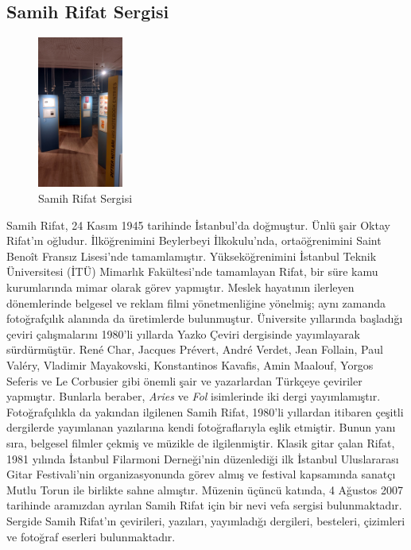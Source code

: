 \subsection{Samih Rifat Sergisi}
\begin{figure}
    \centering
    \includegraphics[width=0.25\textwidth]{assets/samih_rifat.jpg}
    \caption{Samih Rifat Sergisi}
\end{figure}
\indent\indent Samih Rifat, 24 Kasım 1945 tarihinde İstanbul'da doğmuştur. Ünlü şair Oktay Rifat'ın oğludur. İlköğrenimini Beylerbeyi İlkokulu’nda, ortaöğrenimini Saint Benoît Fransız Lisesi’nde tamamlamıştır. Yükseköğrenimini İstanbul Teknik Üniversitesi (İTÜ) Mimarlık Fakültesi’nde tamamlayan Rifat, bir süre kamu kurumlarında mimar olarak görev yapmıştır.\newline
\indent Meslek hayatının ilerleyen dönemlerinde belgesel ve reklam filmi yönetmenliğine yönelmiş; aynı zamanda fotoğrafçılık alanında da üretimlerde bulunmuştur. Üniversite yıllarında başladığı çeviri çalışmalarını 1980’li yıllarda Yazko Çeviri dergisinde yayımlayarak sürdürmüştür. René Char, Jacques Prévert, André Verdet, Jean Follain, Paul Valéry, Vladimir Mayakovski, Konstantinos Kavafis, Amin Maalouf, Yorgos Seferis ve Le Corbusier gibi önemli şair ve yazarlardan Türkçeye çeviriler yapmıştır. Bunlarla beraber, \textit{Aries} ve \textit{Fol} isimlerinde iki dergi yayımlamıştır.\newline
\indent Fotoğrafçılıkla da yakından ilgilenen Samih Rifat, 1980’li yıllardan itibaren çeşitli dergilerde yayımlanan yazılarına kendi fotoğraflarıyla eşlik etmiştir. Bunun yanı sıra, belgesel filmler çekmiş ve müzikle de ilgilenmiştir. Klasik gitar çalan Rifat, 1981 yılında İstanbul Filarmoni Derneği’nin düzenlediği ilk İstanbul Uluslararası Gitar Festivali'nin organizasyonunda görev almış ve festival kapsamında sanatçı Mutlu Torun ile birlikte sahne almıştır.\newline
\indent Müzenin üçüncü katında, 4 Ağustos 2007 tarihinde aramızdan ayrılan Samih Rifat için bir nevi vefa sergisi bulunmaktadır. Sergide Samih Rifat'ın çevirileri, yazıları, yayımladığı dergileri, besteleri, çizimleri ve fotoğraf eserleri bulunmaktadır.